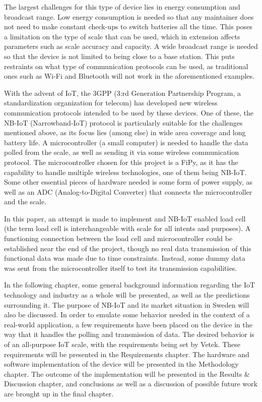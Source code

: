 The largest challenges for this type of device lies in energy consumption and broadcast range. Low energy consumption is needed so that any maintainer does not need to make constant check-ups to switch batteries all the time. This poses a limitation on the type of scale that can be used, which in extension affects parameters such as scale accuracy and capacity. A wide broadcast range is needed so that the device is not limited to being close to a base station. This puts restraints on what type of communication protocols can be used, as traditional ones such as Wi-Fi and Bluetooth will not work in the aforementioned examples.

With the advent of IoT, the 3GPP (3:rd Generation Partnership Program, a standardization organization for telecom) has developed new wireless communication protocols intended to be used by these devices.\cite{3gpp} One of these, the NB-IoT (Narrowband-IoT) protocol is particularly suitable for the challenges mentioned above, as its focus lies (among else) in wide area coverage and long battery life. A microcontroller (a small computer) is needed to handle the data polled from the scale, as well as sending it via some wireless communication protocol. The microcontroller chosen for this project is a FiPy, as it has the capability to handle multiple wireless technologies, one of them being NB-IoT. Some other essential pieces of hardware needed is some form of power supply, as well as an ADC (Analog-to-Digital Converter) that connects the microcontroller and the scale.

In this paper, an attempt is made to implement and NB-IoT enabled load cell (the term load cell is interchangeable with scale for all intents and purposes). A functioning connection between the load cell and microcontroller could be established near the end of the project, though no real data transmission of this functional data was made due to time constraints. Instead, some dummy data was sent from the microcontroller itself to test its transmission capabilities.

In the following chapter, some general background information regarding the IoT technology and industry as a whole will be presented, as well as the predictions surrounding it. The purpose of NB-IoT and its market situation in Sweden will also be discussed. 
In order to emulate some behavior needed in the context of a real-world application, a few requirements have been placed on the device in the way that it handles the polling and transmission of data. The desired behavior is of an all-purpose IoT scale, with the requirements being set by Vetek.  These requirements will be presented in the Requirements chapter.
The hardware and software implementation of the device will be presented in the Methodology chapter.
The outcome of the implementation will be presented in the Results \& Discussion chapter, and
conclusions as well as a discussion of possible future work are brought up in the final chapter.
